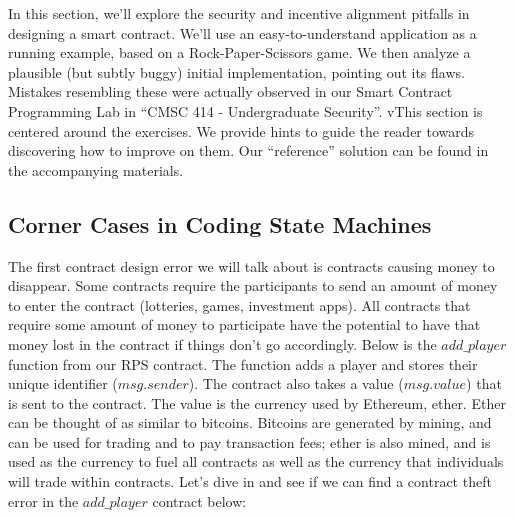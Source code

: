 \documentclass[10pt,twocolumn,letterpaper]{article}
\begin{document}
In this section, we'll explore the security and incentive alignment pitfalls in designing a smart contract. We'll use an easy-to-understand application as a running example, based on a Rock-Paper-Scissors game. We then analyze a plausible (but subtly buggy) initial implementation, pointing out its flaws. Mistakes resembling these were actually observed in our Smart Contract Programming Lab in ``CMSC 414 - Undergraduate Security''. vThis section is centered around the exercises. We provide hints to guide the reader towards discovering how to improve on them. Our ``reference'' solution can be found in the accompanying materials.


\subsection{Corner Cases in Coding State Machines}
The first contract design error we will talk about is contracts causing money to disappear. Some contracts require the participants to send an amount of money to enter the contract (lotteries, games, investment apps). All contracts that require some amount of money to participate have the potential to have that money lost in the contract if things don't go accordingly. Below is the $add\_player$ function from our RPS contract. The function adds a player and stores their unique identifier ($msg.sender$). The contract also takes a value ($msg.value$) that is sent to the contract. The value is the currency used by Ethereum, ether. Ether can be thought of as similar to bitcoins. Bitcoins are generated by mining, and can be used for trading and to pay transaction fees; ether is also mined, and is used as the currency to fuel all contracts as well as the currency that individuals will trade within contracts. Let's dive in and see if we can find a contract theft error in the $add\_player$ contract below: 

\end{document}
